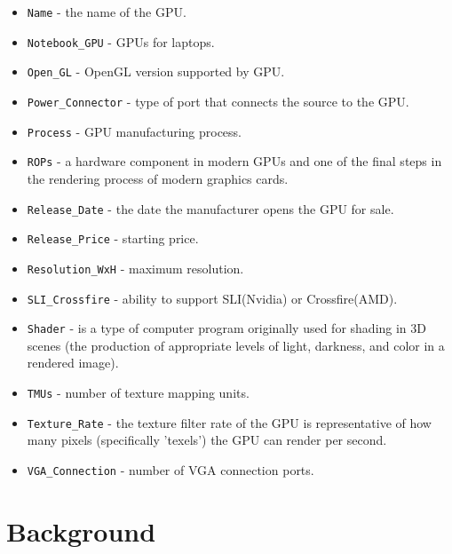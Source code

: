 \documentclass[a4paper]{article}
\theoremstyle{definition}
\begin{document}
\begin{itemize}
    \item \verb|Name| - the name of the GPU.
    \item \verb|Notebook_GPU| - GPUs for laptops.
    \item \verb|Open_GL| - OpenGL version supported by GPU.
    \item \verb|Power_Connector| - type of port that connects the source to the GPU.
    \item \verb|Process| - GPU manufacturing process.
    \item \verb|ROPs| - a hardware component in modern GPUs and one of the final steps in the rendering process of modern graphics cards.
    \item \verb|Release_Date| - the date the manufacturer opens the GPU for sale.
    \item \verb|Release_Price| - starting price.
    \item \verb|Resolution_WxH| - maximum resolution.
    \item \verb|SLI_Crossfire| - ability to support SLI(Nvidia) or Crossfire(AMD).
    \item \verb|Shader| - is a type of computer program originally used for shading in 3D scenes (the production of appropriate levels of light, darkness, and color in a rendered image).
    \item \verb|TMUs| - number of texture mapping units.
    \item \verb|Texture_Rate| - the texture filter rate of the GPU is representative of how many pixels (specifically 'texels') the GPU can render per second.
    \item \verb|VGA_Connection| - number of VGA connection ports.
\end{itemize}
\section{Background}
\end{document}
